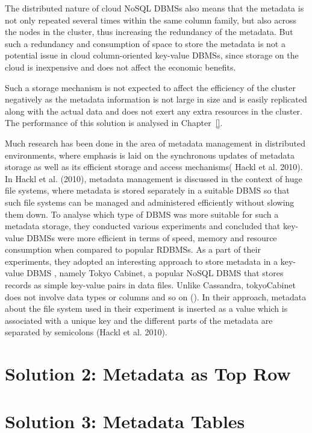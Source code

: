 	The distributed nature of cloud \ac{NoSQL} \acp{DBMS} also means that the
	metadata is not only repeated several times within the same column family,  but
	also across the nodes in the cluster, thus increasing the redundancy of
	the metadata.  But such a redundancy and consumption
	of space to store the metadata is not a potential issue
	in cloud column-oriented key-value \acp{DBMS}, since storage on the cloud is
	inexpensive and  does not affect the economic benefits.

	Such a storage mechanism is not expected to affect the efficiency of the
	cluster negatively as the metadata information is not large in size and is
	easily replicated along with the actual data and does not exert any extra
	resources in the cluster.  The performance of this solution is analysed  in
	Chapter~\ref{}.

	Much research has been done in the area of  metadata management in distributed
	environments,  where emphasis is laid on the synchronous updates of metadata
	storage as well as its efficient storage and access mechanisms(
	Hackl et al.  2010).
	In Hackl et al.  (2010),  metadata management is discussed in the context of
	huge file systems, where metadata is stored separately in a suitable \ac{DBMS}
	so that such file systems can be managed and administered efficiently without
	slowing them down.  To analyse which type of \ac{DBMS} was more suitable for such a
	metadata storage,  they conducted various experiments and concluded that
	key-value \acp{DBMS} were more efficient in terms of speed,  memory and resource
	consumption when compared to popular \acp{RDBMS}.  As a part of their
	experiments, they adopted an interesting approach to store metadata in a
	key-value \ac{DBMS} ,  namely Tokyo Cabinet,  a popular \ac{NoSQL} \ac{DBMS}
	that stores records as simple key-value pairs in data files. Unlike Cassandra,
	tokyoCabinet does not involve data types or columns
	and so on ().  In their approach,  metadata about the file system
	used in their experiment is inserted as a value which is associated with a unique key and the
	different parts of the metadata are separated by semicolons (Hackl et al.  2010).
	
\section{Solution 2:  Metadata as Top Row}\label{s:sol2}



\section{Solution 3:  Metadata Tables}\label{s:sol3}



